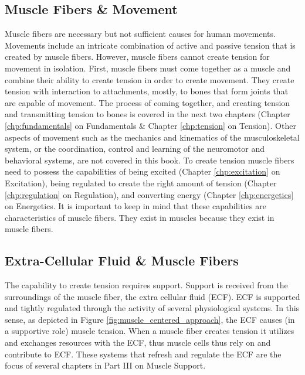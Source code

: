 \subsection{Muscle Fibers \& Movement}

Muscle fibers are necessary but not sufficient causes for human movements. Movements include an intricate combination of active and passive tension that is created by muscle fibers. However, muscle fibers cannot create tension for movement in isolation.  First, muscle fibers must come together as a muscle and combine their ability to create tension in order to create movement. They create tension with interaction to attachments, mostly, to bones\footnotemark{} that form joints that are capable of movement. The process of coming together, and creating tension and transmitting tension to bones is covered in the next two chapters (Chapter \ref{chp:fundamentals} on Fundamentals \& Chapter \ref{chp:tension} on Tension). Other aspects of movement such as the mechanics and kinematics of the musculoskeletal system, or the coordination, control and learning of the neuromotor and behavioral systems, are not covered in this book. To create tension muscle fibers need to possess the capabilities of being excited (Chapter \ref{chp:excitation} on Excitation), being regulated to create the right amount of tension (Chapter \ref{chp:regulation} on Regulation), and converting energy (Chapter \ref{chp:energetics} on Energetics. It is important to keep in mind that these capabilities are characteristics of muscle fibers. They exist in muscles because they exist in muscle fibers.

\subsection{Extra-Cellular Fluid \& Muscle Fibers}

The capability to create tension requires support. Support is received from the surroundings of the muscle fiber, the extra cellular fluid (ECF). ECF is supported and tightly regulated through the activity of several physiological systems. In this sense, as depicted in Figure \ref{fig:muscle_centered_approach}, the ECF causes (in a supportive role) muscle tension.\footnotemark{} When a muscle fiber creates tension it utilizes and exchanges resources with the ECF, thus muscle cells thus rely on and contribute to ECF. These systems that refresh and regulate the ECF are the focus of several chapters in Part III on Muscle Support.

